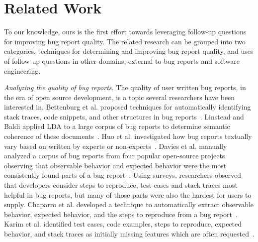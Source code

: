 \section{Related Work}
To our knowledge, ours is the first effort towards leveraging follow-up questions for improving bug report quality. The related research can be grouped into two categories, techniques for determining and improving bug report quality, and uses of follow-up questions in other domains, external to bug reports and software engineering.

\noindent
{\em Analyzing the quality of bug reports.} The quality of user written bug reports, in the era of open source development, is a topic several researchers have been interested in. Bettenburg et al. proposed techniques for automatically identifying stack traces, code snippets, and other structures in bug reports~\cite{bettenburg08extracting}. Linstead and Baldi applied LDA to a large corpus of bug reports to determine semantic coherence of these documents~\cite{linstead09mining}. Huo et al. investigated how bug reports textually vary based on written by experts or non-experts~\cite{Huo2014AnES}. Davies et al. manually analyzed a corpus of bug reports from four popular open-source projects observing that observable behavior and expected behavior were the most consistently found parts of a bug report~\cite{davies14whats}. Using surveys, researchers observed that developers consider steps to reproduce, test cases and stack traces most helpful in bug reports, but many of those parts were also the hardest for users to supply. Chaparro et al. developed a technique to automatically extract observable behavior, expected behavior, and the steps to reproduce from a bug report~\cite{chaparro17detecting}. Karim et al. identified test cases, code examples, steps to reproduce, expected behavior, and stack traces as initially missing features which are often requested~\cite{Karim2017UnderstandingKF, karim2019identifying}.

